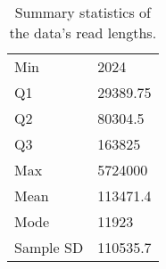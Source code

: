 \begin{table}
    \caption{\label{tab:n} Summary statistics of the data's read lengths.}
    \begin{tabular}{|l|l|}
        \hline
Min & 2024\\
	    Q1 & 29389.75\\

Q2 & 80304.5\\
	    Q3 & \num{163825}\\
Max & \num{5724000}\\
\hline
Mean & 113471.4\\
	    Mode & \num{11923}\\
Sample SD & 110535.7\\
	\hline
    \end{tabular}
\end{table}

